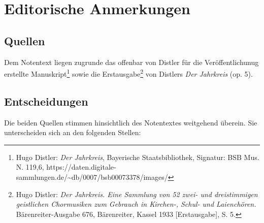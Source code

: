 \documentclass{book}
\begin{document}
\section{Editorische Anmerkungen}
\begin{multicols}{2}

\subsection{Quellen}

Dem Notentext liegen zugrunde das offenbar von Distler für die
Veröffentlichunug erstellte Manuskript\footnote{Hugo Distler: \emph{Der
  Jahrkreis}, Bayerische Staatsbibliothek, Signatur: BSB Mus. N. 119,6,
  https://daten.digitale-sammlungen.de/\textasciitilde db/0007/bsb00073378/images/}
sowie die Erstausgabe\footnote{Hugo Distler: \emph{Der Jahrkreis. Eine
  Sammlung von 52 zwei- und dreistimmigen geistlichen Chormusiken zum
  Gebrauch in Kirchen-, Schul- und Laienchören.} Bärenreiter-Ausgabe
  676, Bärenreiter, Kassel 1933 {[}Erstausgabe{]}, S. 5.} von Distlers
\emph{Der Jahrkreis} (op. 5).

\subsection{Entscheidungen}

Die beiden Quellen stimmen hinsichtlich des Notentextes weitgehend
überein. Sie unterscheiden sich an den folgenden Stellen:


\end{multicols}
\end{document}

